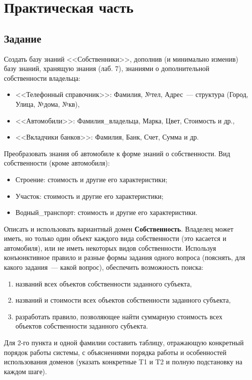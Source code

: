 \chapter{Практическая часть}

\section{Задание}

Создать базу знаний <<Собственники>>, дополнив (и минимально изменив) базу знаний, хранящую знания (лаб. 7), знаниями о дополнительной собственности владельца:
\begin{itemize}
	\item <<Телефонный справочник>>: Фамилия, №тел, Адрес~--- структура (Город, Улица, №дома, №кв),
	\item <<Автомобили>>: Фамилия\_владельца, Марка, Цвет, Стоимость и др.,
	\item <<Вкладчики банков>>: Фамилия, Банк, Счет, Сумма и др.
\end{itemize}

Преобразовать знания об автомобиле к форме знаний о собственности.
Вид собственности (кроме автомобиля):
\begin{itemize}
	\item Строение: стоимость и другие его характеристики;
	\item Участок: стоимость и другие его характеристики;
	\item Водный\_транспорт: стоимость и другие его характеристики.
\end{itemize}

Описать и использовать вариантный домен \textbf{Собственность}.
Владелец может иметь, но только один объект каждого вида собственности (это касается и автомобиля), или не иметь некоторых видов собственности.
Используя конъюнктивное правило и разные формы задания одного вопроса (пояснять, для какого задания~--- какой вопрос), обеспечить возможность поиска:
\begin{enumerate}
	\item названий всех объектов собственности заданного субъекта,
	\item названий и стоимости всех объектов собственности заданного субъекта,
	\item разработать правило, позволяющее найти суммарную стоимость всех объектов собственности заданного субъекта.
\end{enumerate}

Для 2-го пункта и одной фамилии составить таблицу, отражающую конкретный порядок работы системы, с объяснениями порядка работы и особенностей использования доменов (указать конкретные T1 и T2 и полную подстановку на каждом шаге).

